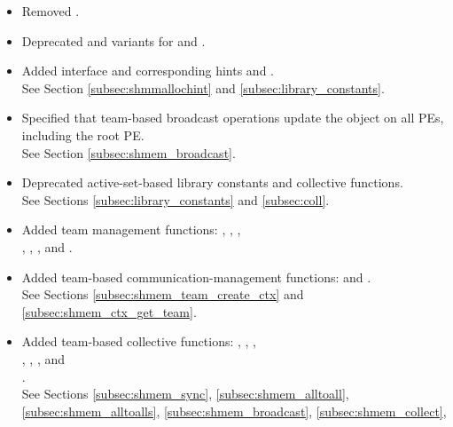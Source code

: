 \begin{itemize}
%
\item Removed .
%
\item Deprecated  and  variants for
 and .
%
\item Added  interface and corresponding hints
 and .
\\ See Section \ref{subsec:shmmallochint} and \ref{subsec:library_constants}.
%
\item Specified that team-based broadcast operations update the  object on
all \acp{PE}, including the root \ac{PE}.
\\ See Section \ref{subsec:shmem_broadcast}.
%
\item Deprecated active-set-based library constants and collective functions.
\\ See Sections \ref{subsec:library_constants} and \ref{subsec:coll}.
%
\item Added team management functions:
  ,
  ,
  , \\
  ,
  ,
  , and
  .
%
%
\item Added team-based communication-management functions:
   and
  .
\\ See Sections
  \ref{subsec:shmem_team_create_ctx} and
  \ref{subsec:shmem_ctx_get_team}.
%
\item Added team-based collective functions: ,
  , , \\
  , , , and \\
  .
  \\ See Sections \ref{subsec:shmem_sync},
  \ref{subsec:shmem_alltoall}, \ref{subsec:shmem_alltoalls},
  \ref{subsec:shmem_broadcast}, \ref{subsec:shmem_collect},

\end{itemize}
